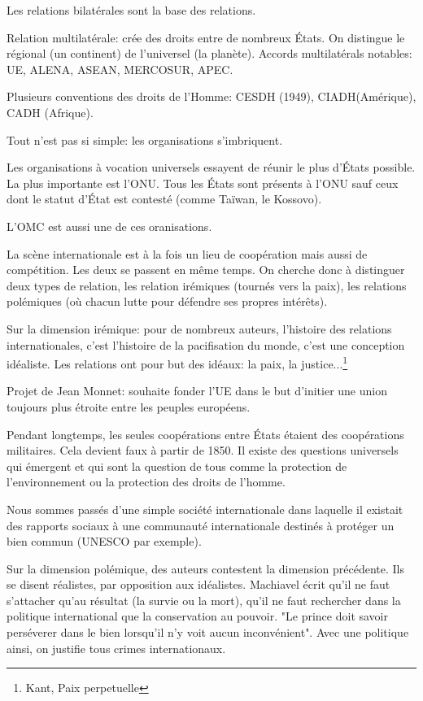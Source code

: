 ﻿\documentclass[12pt, a4paper, openany]{book}
\begin{document}
Les relations bilatérales sont la base des relations.

Relation multilatérale: crée des droits entre de nombreux États. On distingue le régional (un continent) de l'universel (la planète). Accords multilatérals notables: UE, ALENA, ASEAN, MERCOSUR, APEC.

Plusieurs conventions des droits de l'Homme: CESDH (1949), CIADH(Amérique), CADH (Afrique).

Tout n'est pas si simple: les organisations s'imbriquent.


Les organisations à vocation universels essayent de réunir le plus d'États possible. La plus importante est l'ONU. Tous les États sont présents à l'ONU sauf ceux dont le statut d'État est contesté (comme Taïwan, le Kossovo). 

L'OMC est aussi une de ces oranisations. 


La scène internationale est à la fois un lieu de coopération mais aussi de compétition. Les deux se passent en même temps. On cherche donc à distinguer deux types de relation, les relation irémiques (tournés vers la paix), les relations polémiques (où chacun lutte pour défendre ses propres intérêts).

Sur la dimension irémique: pour de nombreux auteurs, l'histoire des relations internationales, c'est l'histoire de la pacifisation du monde, c'est une conception idéaliste. Les relations ont pour but des idéaux: la paix, la justice...\footnote{Kant, Paix perpetuelle}

Projet de Jean Monnet: souhaite fonder l'UE dans le but d'initier une union toujours plus étroite entre les peuples européens. 

Pendant longtemps, les seules coopérations entre États étaient des coopérations militaires. Cela devient faux à partir de 1850. Il existe des questions universels qui émergent et qui sont la question de tous comme la protection de l'environnement ou la protection des droits de l'homme.

Nous sommes passés d'une simple société internationale dans laquelle il existait des rapports sociaux à une communauté internationale destinés à protéger un bien commun (UNESCO par exemple).


Sur la dimension polémique, des auteurs contestent la dimension précédente. Ils se disent réalistes, par opposition aux idéalistes. Machiavel écrit qu'il ne faut s'attacher qu'au résultat (la survie ou la mort), qu'il ne faut rechercher dans la politique international que la conservation au pouvoir. "Le prince doit savoir perséverer dans le bien lorsqu'il n'y voit aucun inconvénient". Avec une politique ainsi, on justifie tous crimes internationaux.
\end{document}
